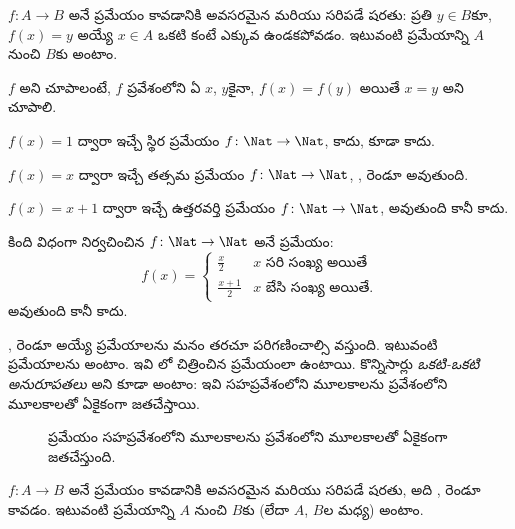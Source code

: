 \documentclass[../../../include/open-logic-section]{subfiles}
\begin{document}
\begin{defn}
$f \colon A \rightarrow B$ అనే ప్రమేయం \emph{} కావడానికి
అవసరమైన మరియు సరిపడే షరతు: ప్రతి $y \in B$కూ, $f(x) = y$ అయ్యే
$x \in A$ ఒకటి కంటే ఎక్కువ ఉండకపోవడం.
ఇటువంటి ప్రమేయాన్ని $A$ నుంచి $B$కు  అంటాం.
\end{defn}

\begin{explain}
$f$  అని చూపాలంటే, $f$ ప్రవేశంలోని ఏ
 $x$, $y$కైనా, $f(x)=f(y)$ అయితే $x=y$ అని చూపాలి.
\end{explain}

\begin{ex}
$f(x) = 1$ ద్వారా ఇచ్చే స్థిర ప్రమేయం $f\colon \Nat \to \Nat$,
 కాదు,  కూడా కాదు.

$f(x) = x$ ద్వారా ఇచ్చే తత్సమ ప్రమేయం $f\colon \Nat \to \Nat$,
,  రెండూ అవుతుంది.

$f(x) = x+1$ ద్వారా ఇచ్చే ఉత్తరవర్తి ప్రమేయం $f \colon \Nat \to \Nat$,
 అవుతుంది కానీ  కాదు.

కింది విధంగా నిర్వచించిన $f \colon \Nat \to \Nat$ అనే ప్రమేయం:
\[
  f(x) =
  \begin{cases}
    \frac{x}{2} & \text{$x$ సరి సంఖ్య అయితే} \\
    \frac{x+1}{2} & \text{$x$ బేసి సంఖ్య అయితే.}
  \end{cases}
\]
 అవుతుంది కానీ  కాదు.
\end{ex}

\begin{explain}
,  రెండూ అయ్యే ప్రమేయాలను మనం తరచూ
పరిగణించాల్సి వస్తుంది. ఇటువంటి ప్రమేయాలను  అంటాం.
ఇవి లో చిత్రించిన ప్రమేయంలా ఉంటాయి.
 కొన్నిసార్లు \emph{ఒకటి-ఒకటి అనురూపతలు} అని కూడా
అంటాం: ఇవి సహప్రవేశంలోని మూలకాలను ప్రవేశంలోని మూలకాలతో ఏకైకంగా జతచేస్తాయి.
\begin{figure}
  \caption{ ప్రమేయం సహప్రవేశంలోని మూలకాలను
    ప్రవేశంలోని మూలకాలతో ఏకైకంగా జతచేస్తుంది.}
\end{figure}
\end{explain}

\begin{defn}
$f \colon A \to B$ అనే ప్రమేయం \emph{} కావడానికి అవసరమైన
మరియు సరిపడే షరతు, అది ,  రెండూ కావడం.
ఇటువంటి ప్రమేయాన్ని $A$ నుంచి $B$కు (లేదా $A$, $B$ల మధ్య)
 అంటాం.
\end{defn}
\end{document}
